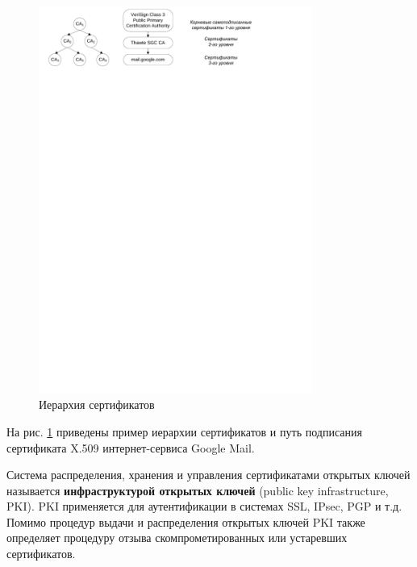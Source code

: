 \begin{figure}[h!]
	\centering
	\includegraphics[width=0.8\textwidth]{pic/X509-hierarchy}
	\caption{Иерархия сертификатов\label{fig:x509-hierarchy}}
\end{figure}

На рис. \ref{fig:x509-hierarchy} приведены пример иерархии сертификатов и путь подписания сертификата X.509 интернет-сервиса Google Mail.

Система распределения, хранения и управления сертификатами открытых ключей называется \textbf{инфраструктурой открытых ключей} (public key infrastructure, PKI). PKI применяется для аутентификации в системах SSL, IPsec, PGP и т.д. Помимо процедур выдачи и распределения открытых ключей PKI также определяет процедуру отзыва скомпрометированных или устаревших сертификатов.
